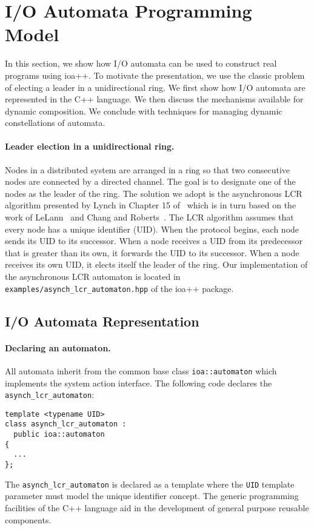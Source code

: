 \section{I/O Automata Programming Model\label{representation}}

In this section, we show how I/O automata can be used to construct real programs using ioa++.
To motivate the presentation, we use the classic problem of electing a leader in a unidirectional ring.
We first show how I/O automata are represented in the C++ language.
We then discuss the mechanisms available for dynamic composition.
We conclude with techniques for managing dynamic constellations of automata.

\paragraph{Leader election in a unidirectional ring.}
Nodes in a distributed system are arranged in a ring so that two consecutive nodes are connected by a directed channel.
The goal is to designate one of the nodes as the leader of the ring.
The solution we adopt is the asynchronous LCR algorithm presented by Lynch in Chapter 15 of~\cite{lynch1996distributed} which is in turn based on the work of LeLann~\cite{le1977distributed} and Chang and Roberts~\cite{chang1979improved}.
The LCR algorithm assumes that every node has a unique identifier (UID).
When the protocol begins, each node sends its UID to its successor.
When a node receives a UID from its predecessor that is greater than its own, it forwards the UID to its successor.
When a node receives its own UID, it elects itself the leader of the ring.
Our implementation of the asynchronous LCR automaton is located in \verb+examples/asynch_lcr_automaton.hpp+ of the ioa++ package.

\subsection{I/O Automata Representation}

\paragraph{Declaring an automaton.}
All automata inherit from the common base class \verb+ioa::automaton+ which implements the system action interface.
The following code declares the \verb+asynch_lcr_automaton+:
\begin{lstlisting}
template <typename UID>
class asynch_lcr_automaton :
  public ioa::automaton
{
  ...
};
\end{lstlisting}
The \verb+asynch_lcr_automaton+ is declared as a template where the \verb+UID+ template parameter must model the unique identifier concept.
The generic programming facilities of the C++ language aid in the development of general purpose reusable components.

